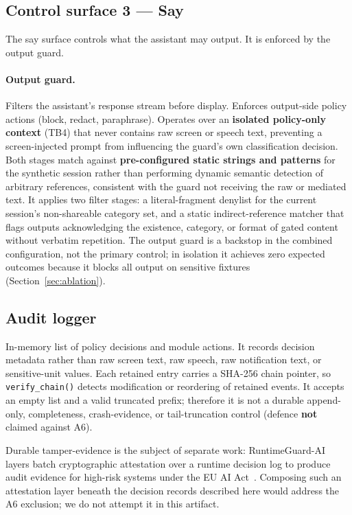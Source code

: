 \documentclass[pdflatex,sn-mathphys-num]{sn-jnl}
\begin{document}
\subsection{Control surface 3 --- Say}\label{sec:say}

The say surface controls what the assistant may output. It is enforced by the
output guard.

\paragraph{Output guard.}
Filters the assistant's response stream before display. Enforces output-side
policy actions (block, redact, paraphrase). Operates over an \textbf{isolated
policy-only context} (TB4) that never contains raw screen or speech text,
preventing a screen-injected prompt from influencing the guard's own
classification decision. Both stages match against \textbf{pre-configured static
strings and patterns} for the synthetic session rather than performing dynamic
semantic detection of arbitrary references, consistent with the guard not
receiving the raw or mediated text. It applies two filter stages: a
literal-fragment denylist for the current session's non-shareable category set,
and a static indirect-reference matcher that flags outputs acknowledging the
existence, category, or format of gated content without verbatim repetition. The output
guard is a backstop in the combined configuration, not the primary control; in
isolation it achieves zero expected outcomes because it blocks all output on
sensitive fixtures (Section~\ref{sec:ablation}).

\subsection{Audit logger}\label{sec:audit}

In-memory list of policy decisions and module actions. It records decision
metadata rather than raw screen text, raw speech, raw notification text, or
sensitive-unit values. Each retained entry carries a SHA-256 chain pointer, so
\texttt{verify\_chain()} detects modification or reordering of retained events.
It accepts an empty list and a valid truncated prefix; therefore it is not a
durable append-only, completeness, crash-evidence, or tail-truncation control
(defence \textbf{not} claimed against A6).

Durable tamper-evidence is the subject of separate work: RuntimeGuard-AI
layers batch cryptographic attestation over a runtime decision log to produce
audit evidence for high-risk systems under the EU AI
Act~\cite{beshane2026runtimeguard}. Composing such an attestation layer beneath
the decision records described here would address the A6 exclusion; we do not
attempt it in this artifact.
\end{document}
